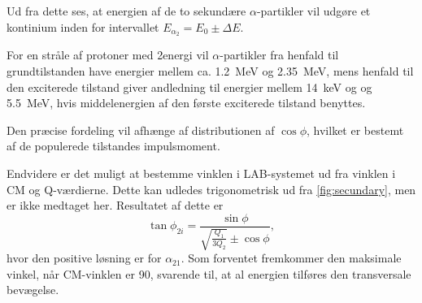 Ud fra dette ses, at energien af de to sekundære $\alpha$-partikler vil udgøre et kontinium inden for
intervallet $E_{\alpha_{2}} = E_{0} \pm \Delta E$.

For en stråle af protoner med 2\MeV energi vil $\alpha$-partikler fra henfald til grundtilstanden have
energier mellem ca. \SI{1.2}{\MeV} og \SI{2.35}{\MeV}, mens henfald til den exciterede tilstand
giver andledning til energier mellem \SI{14}{\keV} og og \SI{5.5}{\MeV}, hvis middelenergien af den
første exciterede tilstand benyttes.

Den præcise fordeling vil afhænge af distributionen af $\cos \phi$, hvilket er bestemt af de populerede
tilstandes impulsmoment. 

Endvidere er det muligt at bestemme vinklen i LAB-systemet ud fra vinklen i CM og Q-værdierne. Dette
kan udledes trigonometrisk ud fra \cref{fig:secundary}, men er ikke medtaget her. Resultatet af dette
er
\begin{equation}
  \label{eq:sekv-vinkel}
  \tan \phi_{2i} = \frac{\sin \phi}{\sqrt{\frac{Q_{1}}{3Q_{2}}} \pm \cos \phi},
\end{equation}
hvor den positive løsning er for $\alpha_{21}$. Som forventet fremkommer den maksimale vinkel, når
CM-vinklen er 90\degree, svarende til, at al energien tilføres den transversale bevægelse.
